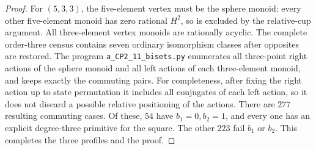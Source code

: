 \begin{proof}
For $(5,3,3)$, the five-element vertex must be the sphere monoid:
every other five-element monoid has zero rational $H^2$, so is
excluded by the relative-cup argument. All three-element vertex
monoids are rationally acyclic. The complete order-three census
contains seven ordinary isomorphism classes after opposites are
restored. The program \texttt{a\_CP2\_11\_bisets.py} enumerates all
three-point right actions of the sphere monoid and all left actions
of each three-element monoid, and keeps exactly the commuting pairs.
For completeness, after fixing the right action up to state
permutation it includes all conjugates of each left action, so it
does not discard a possible relative positioning of the actions.
There are $277$ resulting commuting cases. Of these, $54$ have
$b_1=0,b_2=1$, and every one has an explicit degree-three primitive
for the square. The other $223$ fail $b_1$ or $b_2$.
This completes the three profiles and the proof.
\end{proof}

